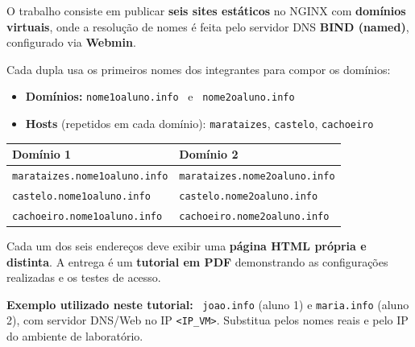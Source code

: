 \documentclass[11pt,a4paper]{article}
\begin{document}
\begin{tcolorbox}[colback=myblue!5, colframe=myblue, boxrule=0.7pt, arc=3pt,
  title={\textbf{Descrição da Atividade}}, fonttitle=\bfseries\color{white},
  colbacktitle=myblue]

O trabalho consiste em publicar \textbf{seis sites estáticos} no NGINX com \textbf{domínios virtuais}, onde a resolução de nomes é feita pelo servidor DNS \textbf{BIND (named)}, configurado via \textbf{Webmin}.

Cada dupla usa os primeiros nomes dos integrantes para compor os domínios:

\vspace{0.3em}
\begin{itemize}
  \item \textbf{Domínios:} \texttt{nome1oaluno.info} \ e \ \texttt{nome2oaluno.info}
  \item \textbf{Hosts} (repetidos em cada domínio): \texttt{marataizes}, \texttt{castelo}, \texttt{cachoeiro}
\end{itemize}

\vspace{0.3em}
\begin{center}
\begin{tabular}{|l|l|}
  \hline
  \textbf{Domínio 1} & \textbf{Domínio 2} \\
  \hline
  \texttt{marataizes.nome1oaluno.info} & \texttt{marataizes.nome2oaluno.info} \\
  \texttt{castelo.nome1oaluno.info}    & \texttt{castelo.nome2oaluno.info} \\
  \texttt{cachoeiro.nome1oaluno.info}  & \texttt{cachoeiro.nome2oaluno.info} \\
  \hline
\end{tabular}
\end{center}

\vspace{0.3em}
Cada um dos seis endereços deve exibir uma \textbf{página HTML própria e distinta}. A entrega é um \textbf{tutorial em PDF} demonstrando as configurações realizadas e os testes de acesso.
\end{tcolorbox}

\vspace{0.3em}

\begin{infobox}
  \textbf{Exemplo utilizado neste tutorial:} \ \texttt{joao.info} (aluno 1) e \texttt{maria.info} (aluno 2), com servidor DNS/Web no IP \texttt{<IP\_VM>}. Substitua pelos nomes reais e pelo IP do ambiente de laboratório.
\end{infobox}
\end{document}
